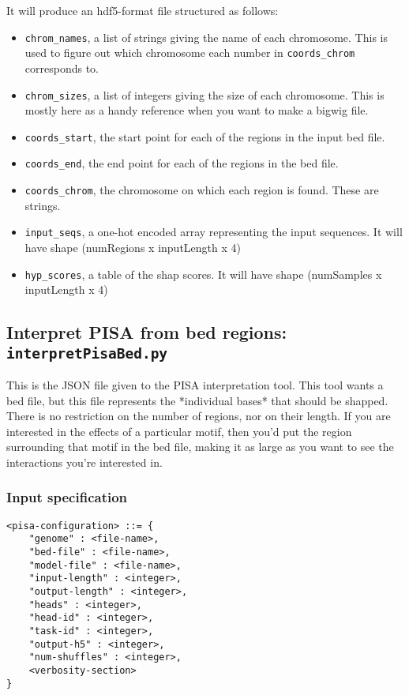 \documentclass{article}
\begin{document}
It will produce an hdf5-format file structured as follows:

\begin{itemize}
        \item \texttt{chrom\_names}, a list of strings giving the name of each chromosome. This is used to figure out which chromosome each number in \texttt{coords\_chrom} corresponds to.
        \item \texttt{chrom\_sizes}, a list of integers giving the size of each chromosome. This is mostly here as a handy reference when you want to make a bigwig file.
        \item \texttt{coords\_start}, the start point for each of the regions in the input bed file.
        \item \texttt{coords\_end}, the end point for each of the regions in the bed file.
        \item \texttt{coords\_chrom}, the chromosome on which each region is found. These are strings.
        \item \texttt{input\_seqs}, a one-hot encoded array representing the input sequences. It will have shape (numRegions x inputLength x 4)
        \item \texttt{hyp\_scores}, a table of the shap scores. It will have shape (numSamples x inputLength x 4)

\end{itemize}




\newpage
\subsection{Interpret PISA from bed regions: \texttt{interpretPisaBed.py}}

This is the JSON file given to the PISA interpretation tool.
This tool wants a bed file, but this file represents the *individual bases* that should be shapped.
There is no restriction on the number of regions, nor on their length. If you are interested in the effects of a particular motif,
then you'd put the region surrounding that motif in the bed file, making it as large as you want to see the interactions you're interested in.

\subsubsection{Input specification}

\begin{lstlisting}
<pisa-configuration> ::= {
    "genome" : <file-name>,
    "bed-file" : <file-name>,
    "model-file" : <file-name>,
    "input-length" : <integer>,
    "output-length" : <integer>,
    "heads" : <integer>,
    "head-id" : <integer>,
    "task-id" : <integer>,
    "output-h5" : <integer>,
    "num-shuffles" : <integer>,
    <verbosity-section>
}
\end{lstlisting}
\end{document}
